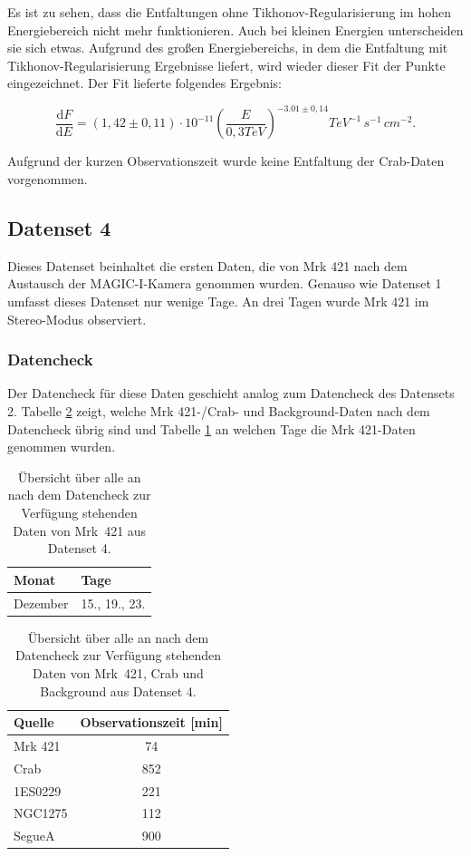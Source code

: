 Es ist zu sehen, dass die Entfaltungen ohne Tikhonov-Regularisierung im hohen Energiebereich nicht mehr funktionieren.
Auch bei kleinen Energien unterscheiden sie sich etwas.
Aufgrund des großen Energiebereichs, in dem die Entfaltung mit Tikhonov-Regularisierung Ergebnisse liefert, wird wieder dieser Fit der Punkte eingezeichnet.
Der Fit lieferte folgendes Ergebnis:

\begin{equation}
 \frac{\mathrm{d}F}{\mathrm{d}E}=(1,42 \pm 0,11) \cdot 10^{-11}\left( \frac{E}{0,3 \si{TeV}} \right)^{-3.01\pm 0,14} \si{TeV^{-1}\,s^{-1}\,cm^{-2}}.
\end{equation}

Aufgrund der kurzen Observationszeit wurde keine Entfaltung der Crab-Daten vorgenommen.

\FloatBarrier

\subsection{Datenset 4}
\label{subsec:Datenset_4}
Dieses Datenset beinhaltet die ersten Daten, die von Mrk 421 nach dem Austausch der MAGIC-I-Kamera genommen wurden. 
Genauso wie Datenset 1 umfasst dieses Datenset nur wenige Tage. 
An drei Tagen wurde Mrk 421 im Stereo-Modus observiert. 

\subsubsection{Datencheck}
Der Datencheck für diese Daten geschieht analog zum Datencheck des Datensets 2. 
Tabelle \ref{tab:Datenset4} zeigt, welche Mrk 421-/Crab- und Background-Daten nach dem Datencheck übrig sind und Tabelle \ref{tab:Datenset4-Mrk421} an welchen Tage die Mrk 421-Daten genommen wurden.

\begin{table}[!h]
\centering
\caption{Übersicht über alle an nach dem Datencheck zur Verfügung stehenden Daten von Mrk~421 aus Datenset 4.}
\label{tab:Datenset4-Mrk421}
\begin{tabular}{ll}
  \toprule
  Monat & Tage\\
  \midrule
  \midrule
Dezember & 15., 19., 23.\\
  \bottomrule
\end{tabular}
\end{table}


\begin{table}[!h]
\centering
\caption{Übersicht über alle an nach dem Datencheck zur Verfügung stehenden Daten von Mrk~421, Crab und Background aus Datenset 4.}
\label{tab:Datenset4}
\begin{tabular}{lc}
  \toprule
  Quelle & Observationszeit [min]\\
  \midrule
  \midrule
  Mrk 421 & 74\\
  \midrule
  Crab & 852\\
  \midrule
  1ES0229 & 221 \\
  NGC1275 & 112 \\
  SegueA & 900  \\
  \bottomrule
  \bottomrule
\end{tabular}
\end{table}

